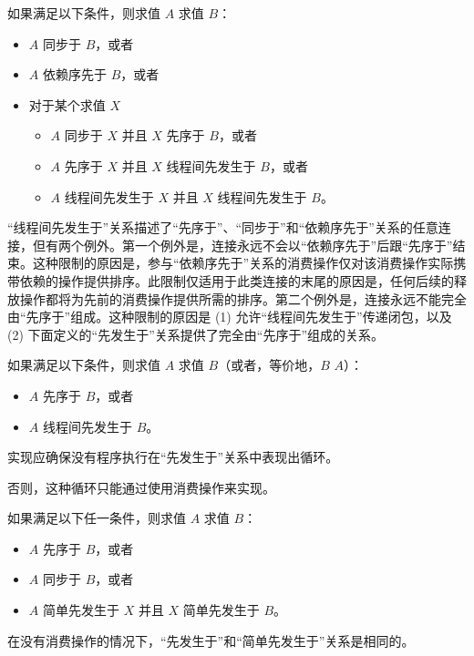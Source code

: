 \pnum
如果满足以下条件，则求值 $A$  求值 $B$：
\begin{itemize}
\item
  $A$ 同步于 $B$，或者
\item
  $A$ 依赖序先于 $B$，或者
\item
  对于某个求值 $X$
  \begin{itemize}
  \item
    $A$ 同步于 $X$ 并且 $X$ 先序于 $B$，或者
  \item
    $A$ 先序于 $X$ 并且 $X$ 线程间先发生于 $B$，或者
  \item
    $A$ 线程间先发生于 $X$ 并且 $X$ 线程间先发生于 $B$。
  \end{itemize}
\end{itemize}
\begin{note}
“线程间先发生于”关系描述了“先序于”、“同步于”和“依赖序先于”关系的任意连接，但有两个例外。第一个例外是，连接永远不会以“依赖序先于”后跟“先序于”结束。这种限制的原因是，参与“依赖序先于”关系的消费操作仅对该消费操作实际携带依赖的操作提供排序。此限制仅适用于此类连接的末尾的原因是，任何后续的释放操作都将为先前的消费操作提供所需的排序。第二个例外是，连接永远不能完全由“先序于”组成。这种限制的原因是 (1) 允许“线程间先发生于”传递闭包，以及 (2) 下面定义的“先发生于”关系提供了完全由“先序于”组成的关系。
\end{note}

\pnum
如果满足以下条件，则求值 $A$  求值 $B$（或者，等价地，$B$  $A$）：
\begin{itemize}
\item $A$ 先序于 $B$，或者
\item $A$ 线程间先发生于 $B$。
\end{itemize}
实现应确保没有程序执行在“先发生于”关系中表现出循环。
\begin{note}
否则，这种循环只能通过使用消费操作来实现。
\end{note}

\pnum
如果满足以下任一条件，则求值 $A$  求值 $B$：
\begin{itemize}
\item $A$ 先序于 $B$，或者
\item $A$ 同步于 $B$，或者
\item $A$ 简单先发生于 $X$ 并且 $X$ 简单先发生于 $B$。
\end{itemize}
\begin{note}
在没有消费操作的情况下，“先发生于”和“简单先发生于”关系是相同的。
\end{note}

